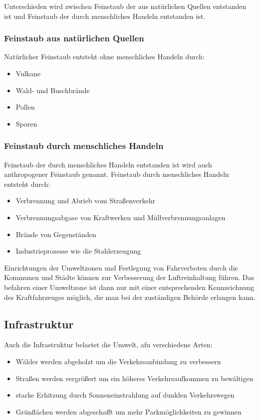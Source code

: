 Unterschieden wird zwischen Feinstaub der aus natürlichen Quellen entstanden ist und Feinstaub der durch menschliches Handeln entstanden ist.

\subsubsection{Feinstaub aus natürlichen Quellen}
Natürlicher Feinstaub entsteht ohne menschliches Handeln durch:
\begin{itemize}
	\item Vulkane
	\item Wald- und Buschbrände
	\item Pollen
	\item Sporen
\end{itemize}


\subsubsection{Feinstaub durch menschliches Handeln}
Feinstaub der durch menschliches Handeln entstanden ist wird auch anthropogener Feinstaub genannt.
Feinstaub durch menschliches Handeln entsteht durch:
\begin{itemize}
	\item Verbrennung und Abrieb vom Straßenverkehr
	\item Verbrennungsabgase von Kraftwerken und Müllverbrennungsanlagen
	\item Brände von Gegenständen
	\item Industrieprozesse wie die Stahlerzeugung
\end{itemize}

Einrichtungen der Umweltzonen und Festlegung von Fahrverboten durch die Kommunen und Städte können zur Verbesserung der Luftreinhaltung führen.
Das befahren einer Umweltzone ist dann nur mit einer entsprechenden Kennzeichnung des Kraftfahrzeuges möglich, die man bei der zuständigen Behörde erlangen kann.



\subsection{Infrastruktur}
Auch die Infrastruktur belastet die Umwelt, afu verschiedene Arten:
\begin{itemize}
	\item Wälder werden abgeholzt um die Verkehrsanbindung zu verbessern
	\item Straßen werden vergrößert um ein höheres Verkehrsaufkommen zu bewältigen
	\item starke Erhitzung durch Sonneneinstrahlung auf dunklen Verkehrswegen
	\item Grünflächen werden abgeschafft um mehr Parkmöglichkeiten zu gewinnen
\end{itemize}
